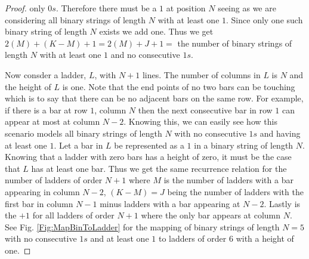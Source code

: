 \begin{proof}
    only $0s$. Therefore there must be a $1$ at position $N$ seeing as we are considering all binary strings of length $N$ with at least one $1$. 
    Since only one such binary string of length $N$ exists we add one. Thus we get $2(M)+(K-M)+1=2(M)+J+1=$ the number of binary strings of length $N$ with at least one $1$ and 
    no consecutive $1s$.\par 
    Now consder a ladder, $L$, with $N+1$ lines. The number of columns in $L$ is $N$ and the height of $L$ is one. Note that the end points 
    of no two bars can be touching which is to say that there can be no adjacent bars on the same row. For example, if there is a bar at row $1$, column $N$ then 
    the next consecutive bar in row $1$ can appear at most at column $N-2$. Knowing this, we can easily see how this scenario models all binary strings of length $N$ with no 
    consecutive $1s$ and having at least one $1$. Let a bar in $L$ be represented as a $1$ in a binary string of length $N$. 
    Knowing that a ladder with zero bars has a height of zero, it must be the case that $L$ has at least one bar. Thus we get the same recurrence relation for the number of 
    ladders of order $N+1$ where $M$ is the number of ladders with a bar appearing in column $N-2$, $(K-M)=J$ being the number of ladders with the first bar in column $N-1$ minus 
    ladders with a bar appearing at $N-2$. Lastly is the $+1$ for all ladders of order $N+1$ where the only bar appears at column $N$.
    See Fig. \ref{Fig:MapBinToLadder} for the mapping of binary strings of length $N=5$ with no consecutive $1s$ and at least one $1$ to ladders of order $6$ with a height of one.\pagebreak

\end{proof}


